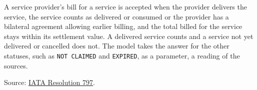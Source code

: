 \begin{definition}
  \label{def:accounting-billing}
  A service provider's bill for a service is accepted when the provider
  delivers the service, the service counts as delivered or consumed or the
  provider has a bilateral agreement allowing earlier billing, and the
  total billed for the service stays within its settlement value.  A
  delivered service counts and a service not yet delivered or cancelled does
  not.  The model takes the answer for the other statuses, such as
  \texttt{NOT CLAIMED} and \texttt{EXPIRED}, as a parameter, a reading of
  the sources.

  Source: \href{https://www.iata.org/contentassets/72cbd60393ff42b5975d90ce9e049a7d/oneorder-resolution-797.pdf}{IATA Resolution 797}.
\end{definition}

